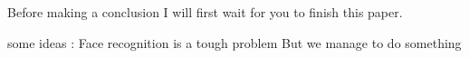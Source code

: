 Before making a conclusion I will first wait for you to finish this paper.

some ideas : 
Face recognition is a tough problem
But we manage to do something